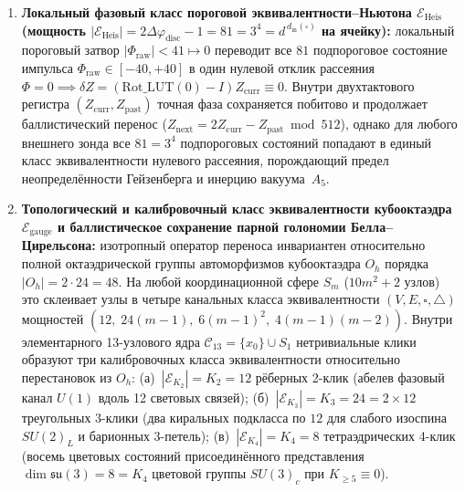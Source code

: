 \begin{enumerate}[leftmargin=*]
\begin{enumerate}[label=\textbf{Уровень~\Roman*.},leftmargin=*]
    \begin{equation}
    \label{eq:compute-weyl-schwinger-pq}
      \hat{U}_Q \hat{V}_P = e^{-2\pi i / K_P}\, \hat{V}_P \hat{U}_Q, \qquad K_P = 2^{\mathrm{frac\_bits}} = 64,
    \end{equation}
    дающему в первом порядке по шагу $2\pi/K_P$ стандартный коммутатор $[\hat{Q},\hat{P}] = i\hbar$ на $\Tlayer$-слое.
  \item \textbf{Локальный фазовый класс пороговой эквивалентности--Ньютона $\mathcal{E}_{\mathrm{Heis}}$ (мощность $|\mathcal{E}_{\mathrm{Heis}}| = 2\Delta\varphi_{\mathrm{disc}} - 1 = 81 = 3^4 = d^{\,d_{\mathrm{in}}(\square)}$ на ячейку):}
    локальный пороговый затвор $|\Phi_{\mathrm{raw}}| < 41 \mapsto 0$ переводит все $81$ подпороговое состояние импульса $\Phi_{\mathrm{raw}} \in [-40,+40]$ в один нулевой отклик рассеяния $\Phi = 0 \implies \delta Z = (\mathrm{Rot\_LUT}(0) - I)Z_{\mathrm{curr}} \equiv 0$.
    Внутри двухтактового регистра $(Z_{\mathrm{curr}},Z_{\mathrm{past}})$ точная фаза сохраняется побитово и продолжает баллистический перенос ($Z_{\mathrm{next}} = 2Z_{\mathrm{curr}} - Z_{\mathrm{past}} \bmod 512$), однако для любого внешнего зонда все $81 = 3^4$ подпороговых состояний попадают в единый класс эквивалентности нулевого рассеяния, порождающий предел неопределённости Гейзенберга и инерцию вакуума~$A_5$.
  \item \textbf{Топологический и калибровочный класс эквивалентности кубооктаэдра $\mathcal{E}_{\mathrm{gauge}}$ и баллистическое сохранение парной голономии Белла--Цирельсона:}
    изотропный оператор переноса инвариантен относительно полной октаэдрической группы автоморфизмов кубооктаэдра $O_h$ порядка $|O_h| = 2\cdot 24 = 48$.
    На любой координационной сфере $S_m$ ($10m^2+2$ узлов) это склеивает узлы в четыре канальных класса эквивалентности $(V, E, \square, \triangle)$ мощностей $(12,\; 24(m-1),\; 6(m-1)^2,\; 4(m-1)(m-2))$.
    Внутри элементарного 13-узлового ядра $\mathcal{C}_{13} = \{x_0\}\cup S_1$ нетривиальные клики образуют три калибровочных класса эквивалентности относительно перестановок из $O_h$:
    (а)~$|\mathcal{E}_{K_2}| = K_2 = 12$ рёберных 2-клик (абелев фазовый канал $U(1)$ вдоль 12 световых связей);
    (б)~$|\mathcal{E}_{K_3}| = K_3 = 24 = 2\times 12$ треугольных 3-клики (два киральных подкласса по $12$ для слабого изоспина $SU(2)_L$ и барионных 3-петель);
    (в)~$|\mathcal{E}_{K_4}| = K_4 = 8$ тетраэдрических 4-клик (восемь цветовых состояний присоединённого представления $\dim\mathfrak{su}(3) = 8 = K_4$ цветовой группы $SU(3)_c$ при $K_{\ge 5} \equiv 0$).

\end{enumerate}
\end{enumerate}
